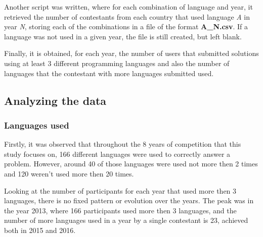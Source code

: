 \documentclass{article}
\begin{document}
\begin{multicols*}{2}
Another script was written, where for each combination of language and year, it retrieved the number of contestants from each country that used language \textit{A} in year \textit{N}, storing each of the combinations in a file of the format \textbf{A\_N.csv}. If a language was not used in a given year, the file is still created, but left blank.

Finally, it is obtained, for each year, the number of users that submitted solutions using at least 3 different programming languages and also the number of languages that the contestant with more languages submitted used.

\subsection{Analyzing the data}

\subsubsection{Languages used}

Firstly, it was observed that throughout the 8 years of competition that this study focuses on, 166 different languages were used to correctly answer a problem. However, around 40 of those languages were used not more then 2 times and 120 weren't used more then 20 times.

Looking at the number of participants for each year that used more then 3 languages, there is no fixed pattern or evolution over the years. The peak was in the year 2013, where 166 participants used more then 3 languages, and the number of more languages used in a year by a single contestant is 23, achieved both in 2015 and 2016.




\end{multicols*}
\end{document}
